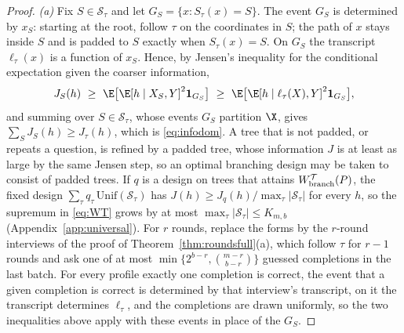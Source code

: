\begin{proof}
\emph{(a)} Fix $S\in\mathcal S_\tau$ and let $G_S=\{x:S_\tau(x)=S\}$. The
event $G_S$ is determined by $x_S$: starting at the root, follow $\tau$ on
the coordinates in $S$; the path of $x$ stays inside $S$ and is padded to $S$
exactly when $S_\tau(x)=S$. On $G_S$ the transcript $\ell_\tau(x)$ is a
function of $x_S$. Hence, by Jensen's inequality for the conditional
expectation given the coarser information,
\[
 J_S(h)\ \ge\ \E\big[\E[h\mid X_S,Y]^2\mathbf 1_{G_S}\big]\ \ge\ \E\big[\E[h\mid\ell_\tau(X),Y]^2\mathbf 1_{G_S}\big],
\]
and summing over $S\in\mathcal S_\tau$, whose events $G_S$ partition $\X$,
gives $\sum_SJ_S(h)\ge J_\tau(h)$, which is \eqref{eq:infodom}. A tree that
is not padded, or repeats a question, is refined by a padded tree, whose
information $J$ is at least as large by the same Jensen step, so an optimal
branching design may be taken to consist of padded trees. If $q$ is a
design on trees that attains $W^{\mathcal T}_{\rm branch}(P)$, the fixed
design $\sum_\tau q_\tau\,\mathrm{Unif}(\mathcal S_\tau)$ has
$J(h)\ge J_q(h)/\max_\tau|\mathcal S_\tau|$ for every $h$, so the supremum in
\eqref{eq:WT} grows by at most $\max_\tau|\mathcal S_\tau|\le K_{m,b}$
(Appendix~\ref{app:universal}). For $r$ rounds, replace the forms by the
$r$-round interviews of the proof of Theorem~\ref{thm:roundsfull}(a), which
follow $\tau$ for $r-1$ rounds and ask one of at most
$\min\{2^{b-r},\binom{m-r}{b-r}\}$ guessed completions in the last batch. For every profile exactly one
completion is correct, the event that a given completion is correct is
determined by that interview's transcript, on it the transcript determines
$\ell_\tau$, and the completions are drawn uniformly, so the two inequalities
above apply with these events in place of the $G_S$.


\end{proof}
